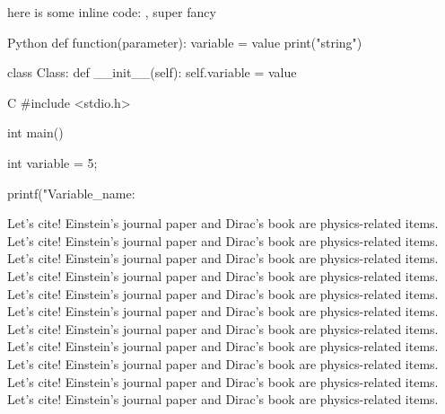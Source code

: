 \documentclass{SimpleLatex}
\begin{document}
\tableofcontents
here is some inline code: , super fancy


\pagebreak


\begin{CodeBlock}[10]{Python}
def function(parameter):
    variable = value
    print("string")

class Class:
    def __init__(self):
        self.variable = value
        
\end{CodeBlock}

\begin{CodeBlock}[5]{C}
#include <stdio.h>

int main() {
    int variable = 5;

    printf("Variable_name: %
}
\end{CodeBlock}

Let's cite! Einstein's journal paper \cite{einstein} and Dirac's
book \cite{dirac} are physics-related items. 
Let's cite! Einstein's journal paper \cite{einstein} and Dirac's
book \cite{dirac} are physics-related items. 
Let's cite! Einstein's journal paper \cite{einstein} and Dirac's
book \cite{dirac} are physics-related items. 
Let's cite! Einstein's journal paper \cite{einstein} and Dirac's
book \cite{dirac} are physics-related items. 
Let's cite! Einstein's journal paper \cite{einstein} and Dirac's
book \cite{dirac} are physics-related items. 
Let's cite! Einstein's journal paper \cite{einstein} and Dirac's
book \cite{dirac} are physics-related items. 
Let's cite! Einstein's journal paper \cite{einstein} and Dirac's
book \cite{dirac} are physics-related items. 
Let's cite! Einstein's journal paper \cite{einstein} and Dirac's
book \cite{dirac} are physics-related items. 
Let's cite! Einstein's journal paper \cite{einstein} and Dirac's
book \cite{dirac} are physics-related items. 
Let's cite! Einstein's journal paper \cite{einstein} and Dirac's
book \cite{dirac} are physics-related items. 
Let's cite! Einstein's journal paper \cite{einstein} and Dirac's
book \cite{dirac} are physics-related items. 
\printbibliography
\end{document}
